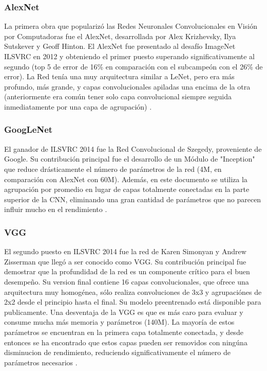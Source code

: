 \documentclass[a4paper,11pt,spanish]{book}
\begin{document}
      \subsubsection{AlexNet}
	La primera obra que popularizó las Redes Neuronales Convolucionales en Visión por Computadoras fue el AlexNet, desarrollada por Alex Krizhevsky, Ilya Sutskever y Geoff Hinton.
	El AlexNet fue presentado al desafío ImageNet ILSVRC  en 2012 y obteniendo el primer puesto superando significativamente al segundo (top 5 de error de 16\% en comparación con el
	subcampeón con el 26\% de error). La Red tenía una muy arquitectura similar a LeNet, pero era más profundo, más grande, y capas convolucionales apiladas una encima de la otra
	(anteriormente era común tener solo capa convolucional siempre seguida inmediatamente por una capa de agrupación) \cite{AlexNet} .

      \subsubsection{GoogLeNet}
	El ganador de ILSVRC 2014 fue la Red Convolucional de Szegedy, proveniente de Google. Su contribución principal fue el desarrollo de un Módulo de "Inception" que reduce drásticamente
	el número de parámetros de la red (4M, en comparación con AlexNet con 60M). Además, en este documento se utiliza la agrupación por promedio en lugar de capas totalmente conectadas
	en la parte superior de la CNN, eliminando una gran cantidad de parámetros que no parecen influir mucho en el rendimiento \cite{Szegedy:Convolutions}.

      \subsubsection{VGG}
	El segundo puesto en ILSVRC 2014 fue la red de Karen Simonyan y Andrew Zisserman que llegó a ser conocido como VGG. Su contribución principal fue demostrar que la profundidad de
	la red es un componente crítico para el buen desempeño. Su version final contiene 16 capas convolucionales, que ofrece una arquitectura muy homogénea, sólo
	realiza convoluciones de 3x3 y agrupaciónes de 2x2 desde el principio hasta el final. Su modelo preentrenado está disponible para publicamente.
	Una desventaja de la VGG es que es más caro para evaluar y consume mucha más memoria y parámetros (140M). La mayoría de estos parámetros se encuentran en la primera
	capa totalmente conectada, y desde entonces se ha encontrado que estos capas pueden ser removidos con ningúna disminucion de rendimiento, reduciendo significativamente el
	número de parámetros necesarios \cite{SimonyanVGG} .
\end{document}
